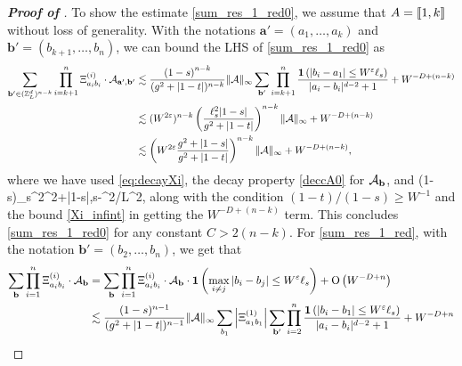 \begin{proof}[\bf Proof of ]
To show the estimate \eqref{sum_res_1_red0}, we assume that $A=\qqq{1,k}$ without loss of generality. With the notations $\mathbf a'=(a_{1},\ldots,a_{k})$ and $\mathbf b'=(b_{k+1},\ldots,b_{n})$, we can bound the LHS of \eqref{sum_res_1_red0} as 
\begin{align*}
\sum_{\mathbf b'\in (\Zn)^{n-k}} \prod_{i=k+1}^n  \Xi^{(i)}_{a_ib_i}  \cdot \mathcal{A}_{\ba',\mathbf{b}'} &\lesssim  \frac{\left(1-s\right)^{n-k}}{(\ilambda^2+|1-t|)^{n-k}} \|\cal A\|_\infty \sum_{\mathbf b'} \prod_{i=k+1}^n\frac{\mathbf 1\left(|b_i-a_1|\le W^\e\ell_s \right)}{|a_i-b_i|^{d-2}+1} +  W^{-D+(n-k)}\\
    &\lesssim (W^{2\e})^{n-k}\left( \frac{\ell_s^2|1-s|}{\ilambda^2+|1-t|} \right)^{n-k} \|\cal A\|_\infty  + W^{-D+(n-k)} \\
    & \lesssim \p{W^{2\e}\frac{\ilambda^2+|1-s|}{\ilambda^2+|1-t|}}^{n-k} \|\cal A\|_\infty  + W^{-D+(n-k)} , 
\end{align*}
where we have used \eqref{eq:decayXi}, the decay property \eqref{deccA0} for $\cal A_{\mathbf b}$, and 
\be\label{eq:1-sells2}(1-s)\ell_s^2\asymp \ilambda^2+|1-s|,\quad {}\quad s-\ilambda^2/L^{2},\ee 
along with the condition $(1-t)/(1-s)\ge W^{-1}$ and the bound \eqref{Xi_infint} in getting the $W^{-D+(n-k)}$ term. This concludes \eqref{sum_res_1_red0} for any constant $C>2(n-k)$.  
For \eqref{sum_res_1_red}, with the notation $\mathbf b'=(b_{2},\ldots,b_{n})$, we get that 
\begin{align}
   \sum_{\mathbf b}\prod_{i=1}^{n} \Xi^{(i)}_{a_ib_i} \cdot \mathcal{A}_{\mathbf b} &= \sum_{\mathbf b}\prod_{i=1}^{n} \Xi^{(i)}_{a_ib_i} \cdot \mathcal{A}_{\mathbf b}\cdot  \mathbf 1\left(\max_{i\ne j}|b_i-b_j|\le W^\e\ell_s \right) + \OO\left( W^{-D+n}\right) \nonumber\\
   &\lesssim \frac{(1-s)^{n-1}}{(\ilambda^2+|1-t|)^{n-1}} \|\cal A\|_\infty \sum_{b_1} \left|\Xi^{(1)}_{a_1b_1}\right| \sum_{\mathbf b'} \prod_{i=2}^n \frac{\mathbf 1\left(|b_i-b_1|\le W^\e\ell_s \right)}{|a_i-b_i|^{d-2}+1} +  W^{-D+n} \nonumber\\

\end{align}
\end{proof}
